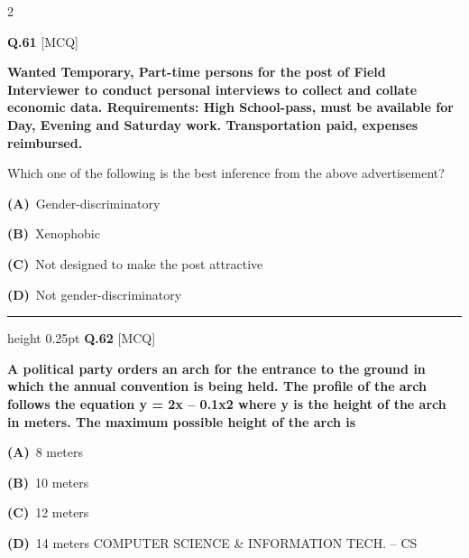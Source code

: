 \documentclass[a4paper,10pt,twoside]{article}
\begin{document}
\begin{multicols}{2}
{\vspace{6pt}
\vspace{3pt}

\noindent\textbf{Q.61} \hfill {\footnotesize\textsf{[MCQ]}}
\par\vspace{2pt}
{\bfseries Wanted Temporary, Part-time persons for the post of Field Interviewer to conduct personal
interviews to collect and collate economic data. Requirements: High School-pass, must be
available for Day, Evening and Saturday work. Transportation paid, expenses reimbursed.
\par\smallskip
Which one of the following is the best inference from the above advertisement? \par}
\par\vspace{2pt}\noindent
\textbf{(A)}~Gender-discriminatory\par\vspace{2pt}\noindent
\textbf{(B)}~Xenophobic\par\vspace{2pt}\noindent
\textbf{(C)}~Not designed to make the post attractive\par\vspace{2pt}\noindent
\textbf{(D)}~Not gender-discriminatory
\par\vspace{6pt}\hrule height 0.25pt\vspace{6pt}
\noindent\textbf{Q.62} \hfill {\footnotesize\textsf{[MCQ]}}
\par\vspace{2pt}
{\bfseries A political party orders an arch for the entrance to the ground in which the annual convention is
being held. The profile of the arch follows the equation y = 2x -- 0.1x2 where y is the height of the
arch in meters. The maximum possible height of the arch is \par}
\par\vspace{2pt}\noindent
\textbf{(A)}~8 meters\par\vspace{2pt}\noindent
\textbf{(B)}~10 meters\par\vspace{2pt}\noindent
\textbf{(C)}~12 meters\par\vspace{2pt}\noindent
\textbf{(D)}~14 meters  COMPUTER SCIENCE \& INFORMATION TECH. -- CS
}
\end{multicols}
\end{document}

